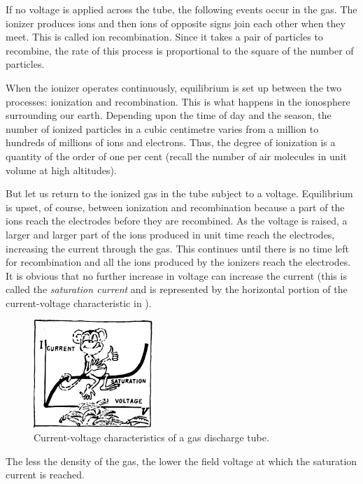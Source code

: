 If no voltage is applied across the tube, the following events occur in the gas. The ionizer produces ions and then ions of opposite signs join each other when they meet. This is called ion recombination. Since it takes a pair of particles to recombine, the rate of this process is proportional to the square of the number of particles.

When the ionizer operates continuously, equilibrium is set up between the two processes: ionization and recombination. This is what happens in the ionosphere surrounding our earth. Depending upon the time of day and the season, the number of ionized particles in a cubic centimetre varies from a million to hundreds of millions of ions and electrons. Thus, the degree of ionization is a quantity of the order of one per cent (recall the number of air molecules in unit volume at high altitudes).

But let us return to the ionized gas in the tube subject to a voltage. Equilibrium is upset, of course, between ionization and recombination because a part of the ions reach the electrodes before they are recombined. As the voltage is raised, a larger and larger part of the ions produced in unit time reach the electrodes, increasing the current through the gas. This continues until there is no time left for recombination and all the ions produced by the ionizers reach the electrodes. It is obvious that no further increase in voltage can increase the current (this is called the \emph{saturation current} and is represented by the horizontal portion of the current-voltage characteristic in ).

\begin{figure}[!ht]
\centering
\includegraphics[width=0.4\textwidth]{figures/fig-02-07.pdf}
\caption{Current-voltage characteristics of a gas discharge tube.}
\label{fig-2.7}
\end{figure}

The less the density of the gas, the lower the field voltage at which the saturation current is reached.

